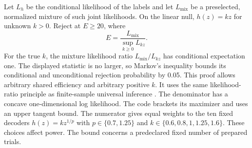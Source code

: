 Let $L_h$ be the conditional likelihood of the labels and let $L_{\mathrm{mix}}$ be a preselected, normalized mixture of such joint likelihoods. On the linear null, $h(z)=kz$ for unknown $k>0$. Reject at $E\ge20$, where
\[
 E=\frac{L_{\mathrm{mix}}}{\sup_{k\ge0}L_{kz}}.
\]
For the true $k$, the mixture likelihood ratio $L_{\mathrm{mix}}/L_{kz}$ has conditional expectation one. The displayed statistic is no larger, so Markov's inequality bounds its conditional and unconditional rejection probability by 0.05. This proof allows arbitrary shared efficiency and arbitrary positive $k$. It uses the same likelihood-ratio principle as finite-sample universal inference \cite{universal}. The denominator has a concave one-dimensional log likelihood. The code brackets its maximizer and uses an upper tangent bound. The numerator gives equal weights to the ten fixed decoders $h(z)=kz^{1/p}$ with $p\in\{0.7,1.25\}$ and $k\in\{0.6,0.8,1,1.25,1.6\}$. These choices affect power. The bound concerns a predeclared fixed number of prepared trials.


